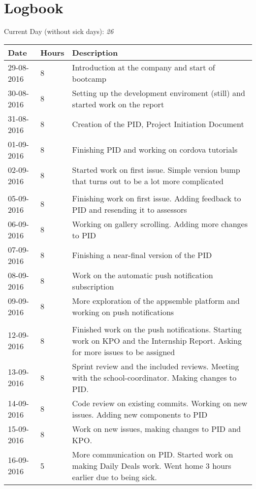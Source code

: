 \chapter{Logbook}
Current Day (without sick days): \emph{26} \\
\begin{tabular}{|p{2cm}|p{1cm}|p{10cm}|}
	\hline
	\textbf{Date} & \textbf{Hours} &  \textbf{Description} \\
	\hline
	29-08-2016 & 8  & Introduction at the company and start of bootcamp \\ \hline
	30-08-2016 & 8  & Setting up the development enviroment (still) and started work on the report \\ \hline
	31-08-2016 & 8 & Creation of the PID, Project Initiation Document \\ \hline
	01-09-2016 & 8 & Finishing PID and working on cordova tutorials \\ \hline
	02-09-2016 & 8 & Started work on first issue. Simple version bump that turns out to be a lot more complicated \\ \hline

	\\ \hline
	
	05-09-2016 & 8 & Finishing work on first issue. Adding feedback to PID and resending it to assessors \\ \hline
	06-09-2016 & 8 & Working on gallery scrolling. Adding more changes to PID \\ \hline
	07-09-2016 & 8 & Finishing a near-final version of the PID \\ \hline
	08-09-2016 & 8 & Work on the automatic push notification subscription \\ \hline
	09-09-2016 & 8 & More exploration of the appsemble platform and working on push notifications \\ \hline
	
	\\ \hline
	
	12-09-2016 & 8 & Finished work on the push notifications. Starting work on KPO and the Internship Report. Asking for more issues to be assigned \\ \hline
	13-09-2016 & 8 & Sprint review and the included reviews. Meeting with the school-coordinator. Making changes to PID. \\ \hline
	14-09-2016 & 8 & Code review on existing commits. Working on new issues. Adding new components to PID \\ \hline
	15-09-2016 & 8 & Work on new issues, making changes to PID and KPO. \\ \hline
	16-09-2016 & 5 & More communication on PID. Started work on making Daily Deals work. Went home 3 hours earlier due to being sick. \\ \hline
	

\end{tabular}
